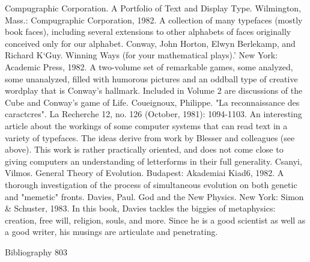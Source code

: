 Compugraphic Corporation. A Portfolio of Text and Display Type. Wilmington, Mass.:
  Compugraphic Corporation, 1982. A collection of many typefaces (mostly book faces),
  including several extensions to other alphabets of faces originally conceived only for our
  alphabet.
Conway, John Horton, Elwyn Berlekamp, and Richard K`Guy. Winning Ways (for your
  mathematical plays).' New York: Academic Press, 1982. A two-volume set of remarkable
  games, some analyzed, some unanalyzed, filled with humorous pictures and an oddball type
  of creative wordplay that is Conway's hallmark. Included in Volume 2 are discussions of the
  Cube and Conway's game of Life.
Coueignoux, Philippe. "La reconnaissance des caractcres". La Recherche 12, no. 126
  (October, 1981): 1094-1103. An interesting article about the workings of some computer
  systems that can read text in a variety of typefaces. The ideas derive from work by Blesser
  and colleagues (see above). This work is rather practically oriented, and does not come
  close to giving computers an understanding of letterforms in their full generality.
Csanyi, Vilmos. General Theory of Evolution. Budapest: Akademiai Kiad6, 1982. A thorough
  investigation of the process of simultaneous evolution on both genetic and "memetic"
  fronts.
Davies, Paul. God and the New Physics. New York: Simon \& Schuster, 1983. In this book,
  Davies tackles the biggies of metaphysics: creation, free will, religion, souls, and more.
  Since he is a good scientist as well as a good writer, his musings are articulate and
  penetrating.

Bibliography                                                                               803

